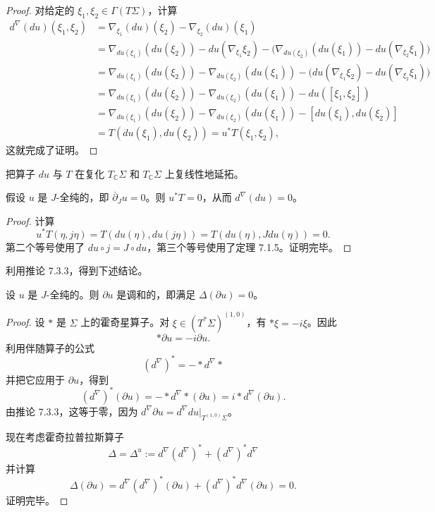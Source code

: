 \begin{proof}
对给定的 $\xi_1,\xi_2\in\Gamma(T\Sigma)$，计算
\[
\begin{split}
 d^\nabla(du)(\xi_1,\xi_2)
 &=\nabla_{\xi_1}(du)(\xi_2)-\nabla_{\xi_2}(du)(\xi_1)\\
 &=\nabla_{du(\xi_1)}(du(\xi_2))-du(\nabla_{\xi_1}\xi_2)
   -\bigl(\nabla_{du(\xi_2)}(du(\xi_1))-du(\nabla_{\xi_2}\xi_1)\bigr)\\
 &=\nabla_{du(\xi_1)}(du(\xi_2))-\nabla_{du(\xi_2)}(du(\xi_1))
   -\bigl(du(\nabla_{\xi_1}\xi_2)-du(\nabla_{\xi_2}\xi_1)\bigr)\\
 &=\nabla_{du(\xi_1)}(du(\xi_2))-\nabla_{du(\xi_2)}(du(\xi_1))-du([\xi_1,\xi_2])\\
 &=\nabla_{du(\xi_1)}(du(\xi_2))-\nabla_{du(\xi_2)}(du(\xi_1))
   -[du(\xi_1),du(\xi_2)]\\
 &=T(du(\xi_1),du(\xi_2))=u^*T(\xi_1,\xi_2),
\end{split}
\]
这就完成了证明。
\end{proof}

把算子 $du$ 与 $T$ 在复化 $T_{\mathbb C}\Sigma$ 和 $T_{\mathbb C}\Sigma$ 上复线性地延拓。

\begin{corollary}\label{cor:j-holomorphic-pullback-torsion-vanishes}
假设 $u$ 是 $J$-全纯的，即 $\overline\partial_Ju=0$。则 $u^*T=0$，从而 $d^\nabla(du)=0$。
\end{corollary}

\begin{proof}
计算
\[
 u^*T(\eta,j\eta)
 =T(du(\eta),du(j\eta))
 =T(du(\eta),Jdu(\eta))=0.
\]
第二个等号使用了 $du\circ j=J\circ du$，第三个等号使用了定理 7.1.5。证明完毕。
\end{proof}

利用推论 7.3.3，得到下述结论。

\begin{theorem}\label{thm:partial-u-harmonic}
设 $u$ 是 $J$-全纯的。则 $\partial u$ 是调和的，即满足
$\Delta(\partial u)=0$。
\end{theorem}

\begin{proof}
设 $*$ 是 $\Sigma$ 上的霍奇星算子。对
$\xi\in(T^*\Sigma)^{(1,0)}$，有 $*\xi=-i\xi$。因此
\begin{equation}
 *\partial u=-i\partial u.
 \label{eq:hodge-star-partial-u}
\end{equation}
利用伴随算子的公式
\[
 (d^\nabla)^*=-*d^\nabla*
\]
并把它应用于 $\partial u$，得到
\[
 (d^\nabla)^*(\partial u)
 =-*d^\nabla*(\partial u)=i*d^\nabla(\partial u).
\]
由推论 7.3.3，这等于零，因为
$d^\nabla\partial u=d^\nabla du|_{T^{(1,0)}\Sigma}$。

现在考虑霍奇拉普拉斯算子
\[
 \Delta=\Delta^u:=d^\nabla(d^\nabla)^*+(d^\nabla)^*d^\nabla
\]
并计算
\begin{equation}
 \Delta(\partial u)
 =d^\nabla(d^\nabla)^*(\partial u)
 +(d^\nabla)^*d^\nabla(\partial u)=0.
 \label{eq:partial-u-hodge-laplacian-zero}
\end{equation}
证明完毕。
\end{proof}

